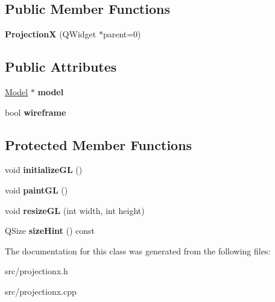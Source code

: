 \subsection*{Public Member Functions}
\begin{DoxyCompactItemize}
\item 
\mbox{\label{class_projection_x_a251536fb76aabbf276ce0cd2341d1dc3}} 
{\bfseries ProjectionX} (Q\+Widget $\ast$parent=0)
\end{DoxyCompactItemize}
\subsection*{Public Attributes}
\begin{DoxyCompactItemize}
\item 
\mbox{\label{class_projection_x_af85d1d33a1a51fa6aef5359f53b98580}} 
\mbox{\hyperlink{class_model}{Model}} $\ast$ {\bfseries model}
\item 
\mbox{\label{class_projection_x_aa9a1f3880a2084eb87cbbe0f98c67a64}} 
bool {\bfseries wireframe}
\end{DoxyCompactItemize}
\subsection*{Protected Member Functions}
\begin{DoxyCompactItemize}
\item 
\mbox{\label{class_projection_x_af94caa374ed76c3cf81c80429c67aee9}} 
void {\bfseries initialize\+GL} ()
\item 
\mbox{\label{class_projection_x_a4fff0844542e49a68b0288c85703b1c4}} 
void {\bfseries paint\+GL} ()
\item 
\mbox{\label{class_projection_x_a7eb1ba9a4266f65982357e53142bc693}} 
void {\bfseries resize\+GL} (int width, int height)
\item 
\mbox{\label{class_projection_x_ad1a6cdc49e0cb1000bc67401a6a8b3a9}} 
Q\+Size {\bfseries size\+Hint} () const
\end{DoxyCompactItemize}


The documentation for this class was generated from the following files\+:\begin{DoxyCompactItemize}
\item 
src/projectionx.\+h\item 
src/projectionx.\+cpp\end{DoxyCompactItemize}
